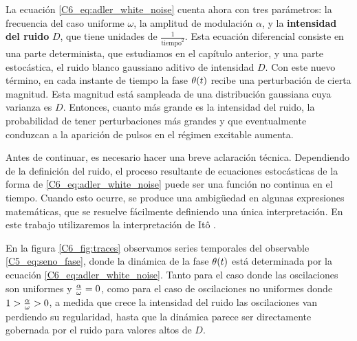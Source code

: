 \documentclass[./main.tex]{subfiles}
\begin{document}
La ecuación \ref{C6_eq:adler_white_noise} cuenta ahora con tres parámetros: la frecuencia del caso uniforme $\omega$, la amplitud de modulación $\alpha$, y la \textbf{intensidad del ruido} $D$, que tiene unidades de $\frac{1}{\text{tiempo}^2}$. Esta ecuación diferencial consiste en una parte determinista, que estudiamos en el capítulo anterior, y una parte estocástica, el ruido blanco gaussiano aditivo de intensidad $D$. Con este nuevo término, en cada instante de tiempo la fase $\theta(t)$ recibe una perturbación de cierta magnitud. Esta magnitud está sampleada de una distribución gaussiana cuya varianza es $D$. Entonces, cuanto más grande es la intensidad del ruido, la probabilidad de tener perturbaciones más grandes y que eventualmente conduzcan a la aparición de pulsos en el régimen excitable aumenta.  


Antes de continuar, es necesario hacer una breve aclaración técnica. Dependiendo de la definición del ruido, el proceso resultante de ecuaciones estocásticas de la forma de \ref{C6_eq:adler_white_noise} puede ser una función no continua en el tiempo. Cuando esto ocurre, se produce una ambigüedad en algunas expresiones matemáticas, que se resuelve fácilmente definiendo una única interpretación. En este trabajo utilizaremos la interpretación de Itô \cite{SanMiguel2000}. 



En la figura \ref{C6_fig:traces} observamos series temporales del observable \ref{C5_eq:seno_fase}, donde la dinámica de la fase $\theta(t)$ está determinada por la ecuación \ref{C6_eq:adler_white_noise}. Tanto para el caso donde las oscilaciones son uniformes y $\frac{\alpha}{\omega} = 0$, como para el caso de oscilaciones no uniformes donde $1 > \frac{\alpha}{\omega} > 0$, a medida que crece la intensidad del ruido las oscilaciones van perdiendo su regularidad, hasta que la dinámica parece ser directamente gobernada por el ruido para valores altos de $D$. 
\end{document}

